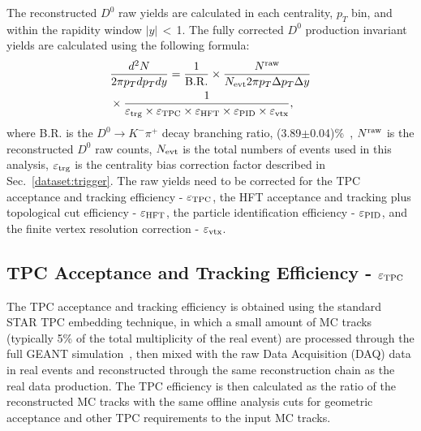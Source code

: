 \documentclass[%
 reprint,	
 amsmath,amssymb,
 aps,
 prc,
]{revtex4-1}
\begin{document}
The reconstructed $D^0$ raw yields are calculated in each centrality, $p_{T}$ bin, and within the rapidity window $|y|$\,$<$\,1. The fully corrected $D^0$ production invariant yields are calculated using the following formula:
\begin{equation}
  \begin{aligned}
& \frac{d^2N}{2\pi p_{T}dp_{T}dy} = \frac{1}{\rm B.R.} \times \frac{N^{\rm raw}}{N_{\rm evt} 2\pi p_{T}\Delta p_{T}\Delta y} \\
& \times \frac{1}{\varepsilon_{\rm trg}\times\varepsilon_{\rm TPC}\times\varepsilon_{\rm HFT}\times\varepsilon_{\rm PID}\times\varepsilon_{\rm vtx}},
  \end{aligned}
\label{equ:invariantyield}
\end{equation}
where B.R. is the $D^0\rightarrow K^-\pi^+$ decay branching ratio, (3.89$\pm$0.04)\%~\cite{pdg}, $N^{\rm raw}$ is the reconstructed $D^0$ raw counts, $N_{\rm evt}$ is the total numbers of events used in this analysis, $\varepsilon_{\rm trg}$ is the centrality bias correction factor described in Sec.~\ref{dataset:trigger}. The raw yields need to be corrected for the TPC acceptance and tracking efficiency - $\varepsilon_{\rm TPC}$, the HFT acceptance and tracking plus topological cut efficiency - $\varepsilon_{\rm HFT}$, the particle identification efficiency - $\varepsilon_{\rm PID}$, and the finite vertex resolution correction - $\varepsilon_{\rm vtx}$.

\subsection{TPC Acceptance and Tracking Efficiency - $\varepsilon_{\rm TPC}$}
\label{correction:tpc}

The TPC acceptance and tracking efficiency is obtained using the standard STAR TPC embedding technique, in which a small amount of MC tracks (typically 5\% of the total multiplicity of the real event) are processed through the full GEANT simulation~\cite{GEANT3}, then mixed with the raw Data Acquisition (DAQ) data in real events and reconstructed through the same reconstruction chain as the real data production. The TPC efficiency is then calculated as the ratio of the reconstructed MC tracks with the same offline analysis cuts for geometric acceptance and other TPC requirements to the input MC tracks.
\end{document}
